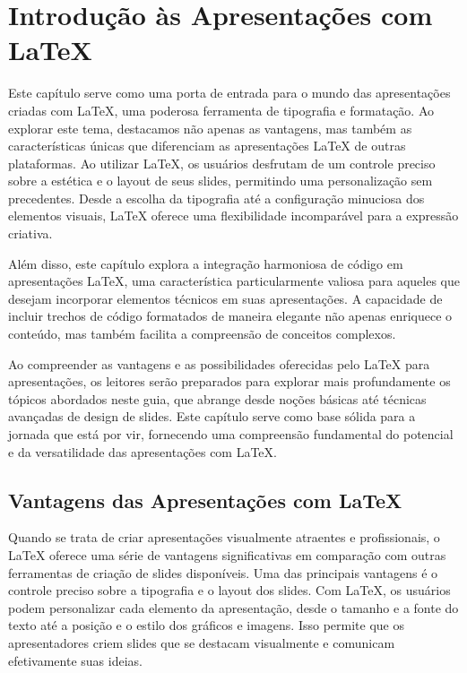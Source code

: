 
\chapter{Introdução às Apresentações com LaTeX}
\label{ch:intro}

Este capítulo serve como uma porta de entrada para o mundo das apresentações criadas com LaTeX, uma poderosa ferramenta de tipografia e formatação. Ao explorar este tema, destacamos não apenas as vantagens, mas também as características únicas que diferenciam as apresentações LaTeX de outras plataformas. Ao utilizar LaTeX, os usuários desfrutam de um controle preciso sobre a estética e o layout de seus slides, permitindo uma personalização sem precedentes. Desde a escolha da tipografia até a configuração minuciosa dos elementos visuais, LaTeX oferece uma flexibilidade incomparável para a expressão criativa.

Além disso, este capítulo explora a integração harmoniosa de código em apresentações LaTeX, uma característica particularmente valiosa para aqueles que desejam incorporar elementos técnicos em suas apresentações. A capacidade de incluir trechos de código formatados de maneira elegante não apenas enriquece o conteúdo, mas também facilita a compreensão de conceitos complexos.

Ao compreender as vantagens e as possibilidades oferecidas pelo LaTeX para apresentações, os leitores serão preparados para explorar mais profundamente os tópicos abordados neste guia, que abrange desde noções básicas até técnicas avançadas de design de slides. Este capítulo serve como base sólida para a jornada que está por vir, fornecendo uma compreensão fundamental do potencial e da versatilidade das apresentações com LaTeX.

\section{Vantagens das Apresentações com LaTeX}
\label{sec:vantagens}

Quando se trata de criar apresentações visualmente atraentes e profissionais, o LaTeX oferece uma série de vantagens significativas em comparação com outras ferramentas de criação de slides disponíveis. Uma das principais vantagens é o controle preciso sobre a tipografia e o layout dos slides. Com LaTeX, os usuários podem personalizar cada elemento da apresentação, desde o tamanho e a fonte do texto até a posição e o estilo dos gráficos e imagens. Isso permite que os apresentadores criem slides que se destacam visualmente e comunicam efetivamente suas ideias.

